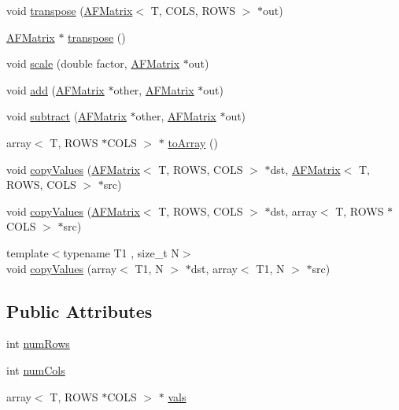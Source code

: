 \begin{DoxyCompactItemize}
\item 
void \hyperlink{class_a_f_matrix_ae087fb4a064d256eac51513863b06fa2}{transpose} (\hyperlink{class_a_f_matrix}{A\+F\+Matrix}$<$ T, C\+O\+LS, R\+O\+WS $>$ $\ast$out)
\item 
\hyperlink{class_a_f_matrix}{A\+F\+Matrix} $\ast$ \hyperlink{class_a_f_matrix_a5f20b3ee2b16cbb9b9b39215a81d3aa1}{transpose} ()
\item 
void \hyperlink{class_a_f_matrix_a905b58769fceaf03972f7ea179ea3934}{scale} (double factor, \hyperlink{class_a_f_matrix}{A\+F\+Matrix} $\ast$out)
\item 
void \hyperlink{class_a_f_matrix_aad31e9f92bfa3323313b153fddcd676b}{add} (\hyperlink{class_a_f_matrix}{A\+F\+Matrix} $\ast$other, \hyperlink{class_a_f_matrix}{A\+F\+Matrix} $\ast$out)
\item 
void \hyperlink{class_a_f_matrix_a8826fb01197325729f0516721e14027f}{subtract} (\hyperlink{class_a_f_matrix}{A\+F\+Matrix} $\ast$other, \hyperlink{class_a_f_matrix}{A\+F\+Matrix} $\ast$out)
\item 
array$<$ T, R\+O\+WS $\ast$C\+O\+LS $>$ $\ast$ \hyperlink{class_a_f_matrix_a7e3659073ff6da5ffd02de48156decf5}{to\+Array} ()
\item 
void \hyperlink{class_a_f_matrix_ad44dc733a8bcf412437d0beebd458176}{copy\+Values} (\hyperlink{class_a_f_matrix}{A\+F\+Matrix}$<$ T, R\+O\+WS, C\+O\+LS $>$ $\ast$dst, \hyperlink{class_a_f_matrix}{A\+F\+Matrix}$<$ T, R\+O\+WS, C\+O\+LS $>$ $\ast$src)
\item 
void \hyperlink{class_a_f_matrix_ac655b95d85d38a72621381b5cf89df83}{copy\+Values} (\hyperlink{class_a_f_matrix}{A\+F\+Matrix}$<$ T, R\+O\+WS, C\+O\+LS $>$ $\ast$dst, array$<$ T, R\+O\+WS $\ast$C\+O\+LS $>$ $\ast$src)
\item 
{\footnotesize template$<$typename T1 , size\+\_\+t N$>$ }\\void \hyperlink{class_a_f_matrix_ac8930dd6d5ea5167fed5c768b96635f7}{copy\+Values} (array$<$ T1, N $>$ $\ast$dst, array$<$ T1, N $>$ $\ast$src)
\end{DoxyCompactItemize}
\subsection*{Public Attributes}
\begin{DoxyCompactItemize}
\item 
int \hyperlink{class_a_f_matrix_a8e18ed7d084bfa8b040f7abd89918b42}{num\+Rows}
\item 
int \hyperlink{class_a_f_matrix_aed28746540fcca94d5d1448b098b4ecc}{num\+Cols}
\item 
array$<$ T, R\+O\+WS $\ast$C\+O\+LS $>$ $\ast$ \hyperlink{class_a_f_matrix_abca47cc50d551c1e8d79559773729e87}{vals}
\end{DoxyCompactItemize}


